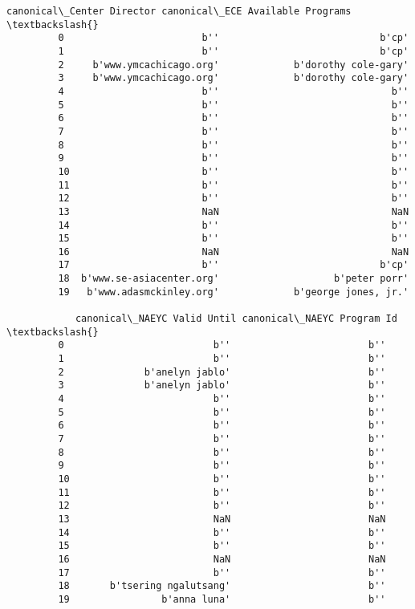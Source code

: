 \documentclass[11pt]{article}
\begin{document}
\begin{Verbatim}[commandchars=\\\{\}]
            canonical\_Center Director canonical\_ECE Available Programs  \textbackslash{}
         0                        b''                            b'cp'   
         1                        b''                            b'cp'   
         2     b'www.ymcachicago.org'             b'dorothy cole-gary'   
         3     b'www.ymcachicago.org'             b'dorothy cole-gary'   
         4                        b''                              b''   
         5                        b''                              b''   
         6                        b''                              b''   
         7                        b''                              b''   
         8                        b''                              b''   
         9                        b''                              b''   
         10                       b''                              b''   
         11                       b''                              b''   
         12                       b''                              b''   
         13                       NaN                              NaN   
         14                       b''                              b''   
         15                       b''                              b''   
         16                       NaN                              NaN   
         17                       b''                            b'cp'   
         18  b'www.se-asiacenter.org'                    b'peter porr'   
         19   b'www.adasmckinley.org'             b'george jones, jr.'   
         
            canonical\_NAEYC Valid Until canonical\_NAEYC Program Id  \textbackslash{}
         0                          b''                        b''   
         1                          b''                        b''   
         2              b'anelyn jablo'                        b''   
         3              b'anelyn jablo'                        b''   
         4                          b''                        b''   
         5                          b''                        b''   
         6                          b''                        b''   
         7                          b''                        b''   
         8                          b''                        b''   
         9                          b''                        b''   
         10                         b''                        b''   
         11                         b''                        b''   
         12                         b''                        b''   
         13                         NaN                        NaN   
         14                         b''                        b''   
         15                         b''                        b''   
         16                         NaN                        NaN   
         17                         b''                        b''   
         18       b'tsering ngalutsang'                        b''   
         19                b'anna luna'                        b''   
         

\end{Verbatim}
\end{document}
